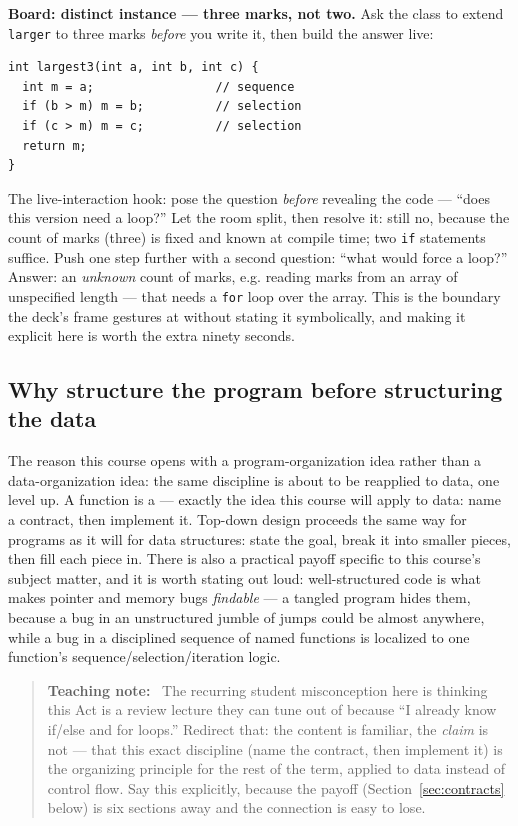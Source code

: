 \documentclass[11pt]{article}
\newenvironment{teachingaside}{\begin{quote}\small\color{primary-gold}\textbf{Teaching note:}\ }{\end{quote}}
\begin{document}
\textbf{Board: distinct instance --- three marks, not two.} Ask the class to extend \texttt{larger} to three marks \emph{before} you write it, then build the answer live:
\begin{verbatim}
int largest3(int a, int b, int c) {
  int m = a;                 // sequence
  if (b > m) m = b;          // selection
  if (c > m) m = c;          // selection
  return m;
}
\end{verbatim}
The live-interaction hook: pose the question \emph{before} revealing the code --- ``does this version need a loop?'' Let the room split, then resolve it: still no, because the count of marks (three) is fixed and known at compile time; two \texttt{if} statements suffice. Push one step further with a second question: ``what would force a loop?'' Answer: an \emph{unknown} count of marks, e.g. reading marks from an array of unspecified length --- that needs a \texttt{for} loop over the array. This is the boundary the deck's frame gestures at without stating it symbolically, and making it explicit here is worth the extra ninety seconds.

\subsection{Why structure the program before structuring the data}

The reason this course opens with a program-organization idea rather than a data-organization idea: the same discipline is about to be reapplied to data, one level up. A function is a  --- exactly the idea this course will apply to data: name a contract, then implement it. Top-down design proceeds the same way for programs as it will for data structures: state the goal, break it into smaller pieces, then fill each piece in. There is also a practical payoff specific to this course's subject matter, and it is worth stating out loud: well-structured code is what makes pointer and memory bugs \emph{findable} --- a tangled program hides them, because a bug in an unstructured jumble of jumps could be almost anywhere, while a bug in a disciplined sequence of named functions is localized to one function's sequence/selection/iteration logic.

\begin{teachingaside}
The recurring student misconception here is thinking this Act is a review lecture they can tune out of because ``I already know if/else and for loops.'' Redirect that: the content is familiar, the \emph{claim} is not --- that this exact discipline (name the contract, then implement it) is the organizing principle for the rest of the term, applied to data instead of control flow. Say this explicitly, because the payoff (Section~\ref{sec:contracts} below) is six sections away and the connection is easy to lose.
\end{teachingaside}
\end{document}
